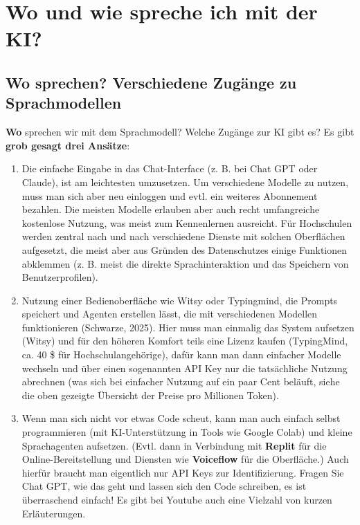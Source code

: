 \documentclass[
  ngerman,
  letterpaper,
  DIV=11]{scrreprt}
\begin{document}
\section{Wo und wie spreche ich mit der KI?}\label{sec-access}

\subsection{Wo sprechen? Verschiedene Zugänge zu
Sprachmodellen}\label{sec-access-modes}

\textbf{Wo} sprechen wir mit dem Sprachmodell? Welche Zugänge zur KI
gibt es? Es gibt \textbf{grob gesagt drei Ansätze}:

\begin{enumerate}
\def\labelenumi{\arabic{enumi}.}
\item
  Die einfache Eingabe in das Chat-Interface (z. B. bei Chat GPT oder
  Claude), ist am leichtesten umzusetzen. Um verschiedene Modelle zu
  nutzen, muss man sich aber neu einloggen und evtl. ein weiteres
  Abonnement bezahlen. Die meisten Modelle erlauben aber auch recht
  umfangreiche kostenlose Nutzung, was meist zum Kennenlernen ausreicht.
  Für Hochschulen werden zentral nach und nach verschiedene Dienste mit
  solchen Oberflächen aufgesetzt, die meist aber aus Gründen des
  Datenschutzes einige Funktionen abklemmen (z. B. meist die direkte
  Sprachinteraktion und das Speichern von Benutzerprofilen).
\item
  Nutzung einer Bedienoberfläche wie Witsy oder Typingmind, die Prompts
  speichert und Agenten erstellen lässt, die mit verschiedenen Modellen
  funktionieren (Schwarze, 2025). Hier muss man einmalig das System
  aufsetzen (Witsy) und für den höheren Komfort teils eine Lizenz kaufen
  (TypingMind, ca. 40 \$ für Hochschulangehörige), dafür kann man dann
  einfacher Modelle wechseln und über einen sogenannten API Key nur die
  tatsächliche Nutzung abrechnen (was sich bei einfacher Nutzung auf ein
  paar Cent beläuft, siehe die oben gezeigte Übersicht der Preise pro
  Millionen Token).
\item
  Wenn man sich nicht vor etwas Code scheut, kann man auch einfach
  selbst programmieren (mit KI-Unterstützung in Tools wie Google Colab)
  und kleine Sprachagenten aufsetzen. (Evtl. dann in Verbindung mit
  \textbf{Replit} für die Online-Bereitstellung und Diensten wie
  \textbf{Voiceflow} für die Oberfläche.) Auch hierfür braucht man
  eigentlich nur API Keys zur Identifizierung. Fragen Sie Chat GPT, wie
  das geht und lassen sich den Code schreiben, es ist überraschend
  einfach! Es gibt bei Youtube auch eine Vielzahl von kurzen
  Erläuterungen.
\end{enumerate}
\end{document}
